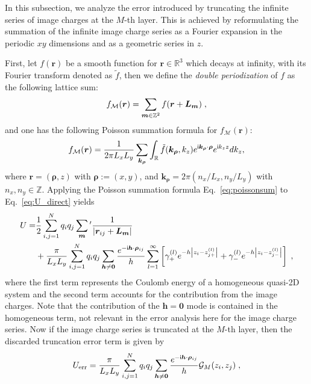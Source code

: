 In this subsection, we analyze the error introduced by truncating the infinite series of image charges at the $M$-th layer. 
This is achieved by reformulating the summation of the infinite image charge series as a Fourier expansion in the periodic $xy$ dimensions and as a geometric series in $z$. 

First, 
let $f(\bm r)$ be a smooth function for $\bm r\in\mathbb R^3$ which decays at infinity, with its Fourier transform denoted as $\widetilde{f}$, then we define the \emph{double periodization} of $f$ as the following lattice sum:
\begin{equation}
f_{\mathcal M} (\bm r)=\sum_{\boldsymbol{m}\in\mathbb{Z}^2} f(\boldsymbol{r}+\boldsymbol{L}_{\bm{m}})\;,
\end{equation}
and one has the following Poisson summation formula for $f_{\mathcal M} (\bm r)$:
\begin{equation}\label{eq:poissonsum}
f_{\mathcal M} (\bm r)=\frac{1}{2 \pi L_x L_y} \sum_{\bm{k}_{\bm{\rho}}} \int_{\mathbb{R}} \tilde{f}(\bm{k}_{\bm{\rho}}, k_z) e^{\mathsf i \bm{k}_{\bm{\rho}} \cdot \boldsymbol{\rho}} e^{\mathsf i k_z z} d k_z,
\end{equation}
where $\bm{r}=(\bm{\rho},z)$ with $\bm{\rho}:=(x,y)$, and $\bm{k}_{\bm{\rho}}=2\pi(n_x/L_x,n_y/L_y)$ with $n_x,n_y\in\mathbb{Z}$. 
Applying the Poisson summation formula Eq.~\eqref{eq:poissonsum} to Eq.~\eqref{eq:U_direct} yields 
\begin{equation}\label{eq::33_icm}
    \begin{split}
        U = & \frac{1}{2}\sum_{i,j=1}^{N}q_iq_j\sum_{\bm{m}}{}^\prime\frac{1}{\left|\bm{r}_{ij}+\boldsymbol{L}_{\bm{m}}\right|} \\
        & + \frac{\pi}{L_xL_y}\sum_{i,j=1}^{N}q_iq_j\sum_{\bm{h}\neq \bm{0}}\frac{e^{-\mathsf i \bm{h}\cdot\bm{\rho}_{ij}}}{h}  \sum\limits_{l=1}^{\infty}\left[\gamma_+^{(l)}e^{-h\left|z_i-z_{j+}^{(l)}\right|}+\gamma_-^{(l)}e^{-h\left|z_i-z_{j-}^{(l)}\right|}\right] \;,
    \end{split}
\end{equation}
where the first term represents the Coulomb energy of a homogeneous quasi-2D system and the second term accounts for the contribution from the image charges. Note that the contribution of the $\bm{h}=\bm{0}$ mode is contained in the homogeneous term, not relevant in the error analysis here for the image charge series.
Now if the image charge series is truncated at the $M$-th layer, then the discarded truncation error term is given by
\begin{equation}\label{eq:trucation_error}
U_{\text{err}}=\frac{\pi}{L_xL_y}\sum_{i,j=1}^{N}q_iq_j\sum_{\bm{h}\neq \bm{0}}\frac{e^{-\i \bm{h}\cdot\bm{\rho}_{ij}}}{h}\mathcal{G}_{M}(z_i,z_j)\;,  %
\end{equation}
